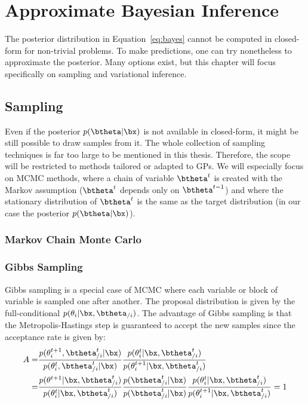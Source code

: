 \section{Approximate Bayesian Inference}
\label{sec:approx_inf}
The posterior distribution in Equation~\eqref{eq:bayes} cannot be computed in closed-form for non-trivial problems.
To make predictions, one can try nonetheless to approximate the posterior.
Many options exist, but this chapter will focus specifically on sampling and variational inference.

\subsection{Sampling}

Even if the posterior $p(\btheta|\bx)$ is not available in closed-form, it might be still possible to draw samples from it.
The whole collection of sampling techniques is far too large to be mentioned in this thesis.
Therefore, the scope will be restricted to methods tailored or adapted to \ac{GPs}.
We will especially focus on \ac{MCMC} methods, where a chain of variable $\btheta^t$ is created with the Markov assumption ($\btheta^t$ depends only on $\btheta^{t-1}$) and where the stationary distribution of $\btheta^t$ is the same as the target distribution (in our case the posterior $p(\btheta|\bx)$).

\subsubsection{Markov Chain Monte Carlo}

\subsubsection{Gibbs Sampling}

Gibbs sampling is a special case of \ac{MCMC} where each variable or block of variable is sampled one after another.
The proposal distribution is given by the full-conditional $p(\theta_i|\bx,\btheta_{/i})$.
The advantage of Gibbs sampling is that the Metropolis-Hastings step is guaranteed to accept the new samples since the acceptance rate is given by:
\begin{align*}
    A =& \frac{p(\theta^{t+1}_i,\btheta^t_{/i}|\bx)}{p(\theta^t_i,\btheta^t_{/i}|\bx)}\frac{p(\theta^t_i|\bx,\btheta^{t}_{/i})}{p(\theta^{t+1}_i|\bx,\btheta^t_{/i})}\\
    =& \frac{p(\theta^{t+1}|\bx, \btheta^{t}_{/i})}{p(\theta^t_i|\bx,\btheta^t_{/i})}\frac{p(\btheta^t_{/i}|\bx)}{p(\btheta^t_{/i}|\bx)}\frac{p(\theta^t_i|\bx,\btheta^{t}_{/i})}{p(\theta^{t+1}_i|\bx,\btheta^t_{/i})} = 1
\end{align*}

